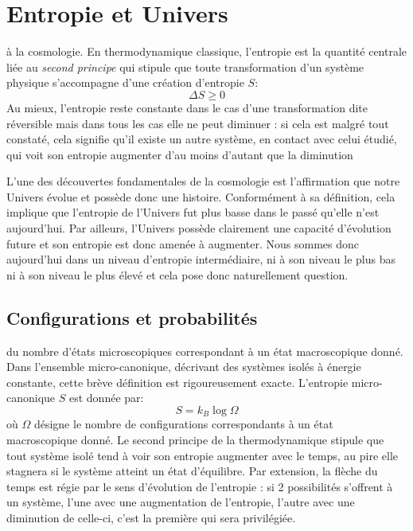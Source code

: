 \chapter{Entropie et Univers}
 à la cosmologie. En thermodynamique classique, l'entropie est la quantité centrale liée au \textit{second principe} qui stipule que toute transformation d'un système physique s'accompagne d'une création d'entropie $S$:
\begin{equation}
\Delta S \ge 0
\end{equation}
Au mieux, l'entropie reste constante dans le cas d'une transformation dite réversible mais dans tous les cas elle ne peut diminuer : si cela est malgré tout constaté, cela signifie qu'il existe un autre système, en contact avec celui étudié, qui voit son entropie augmenter d'au moins d'autant que la diminution 

L'une des découvertes fondamentales de la cosmologie est l'affirmation que notre Univers évolue et possède donc une histoire. Conformément à sa définition, cela implique que l'entropie de l'Univers fut plus basse dans le passé qu'elle n'est aujourd'hui. Par ailleurs, l'Univers possède clairement une capacité d'évolution future et son entropie est donc amenée à augmenter. Nous sommes donc aujourd'hui dans un niveau d'entropie intermédiaire, ni à son niveau le plus bas ni à son niveau le plus élevé et cela pose donc naturellement question.

\section{Configurations et probabilités}
 du nombre d'états microscopiques correspondant à un état macroscopique donné. Dans l'ensemble micro-canonique, décrivant des systèmes isolés à énergie constante, cette brève définition est rigoureusement exacte. L'entropie micro-canonique $S$ est donnée par:
\begin{equation}
S=k_B\log \Omega
\end{equation}
où $\Omega$ désigne le nombre de configurations correspondants à un état macroscopique donné. Le second principe de la thermodynamique stipule que tout système isolé tend à voir son entropie augmenter avec le temps, au pire elle stagnera si le système atteint un état d'équilibre. Par extension, la flèche du temps est régie par le sens d'évolution de l'entropie : si 2 possibilités s'offrent à un système, l'une avec une augmentation de l'entropie, l'autre avec une diminution de celle-ci, c'est la première qui sera privilégiée.

